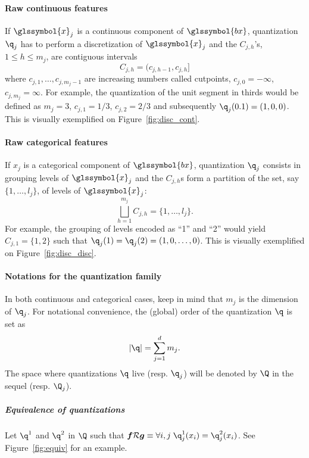 \paragraph{Raw continuous features} If $\glssymbol{x}_j$ is a continuous component of $\glssymbol{bx}$, quantization $\q_j$ has to perform a discretization of $\glssymbol{x}_j$ and the $C_{j,h}$'s, $1\le h\le m_j$, are contiguous intervals  
\begin{equation}\label{eq:Cjhcont}
C_{j,h}=(c_{j,h-1},c_{j,h}]
\end{equation}
where $c_{j,1},\ldots,c_{j,m_j-1}$ are increasing numbers called cutpoints, $c_{j,0}=-\infty$, $c_{j,m_j}=\infty$. For example, the quantization of the unit segment in thirds would be defined as $m_j=3$, $c_{j,1} = 1/3$, $c_{j,2} = 2/3$ and subsequently $\q_j(0.1) = (1,0,0)$. This is visually exemplified on Figure~\ref{fig:disc_cont}.
\paragraph{Raw categorical features} If $x_j$ is a categorical component of $\glssymbol{bx}$, quantization $\q_j$ consists in grouping levels of $\glssymbol{x}_j$ and the $C_{j,h}$s form a partition of the set, say $\{1,\ldots,l_j\}$, of levels of $\glssymbol{x}_j$: 
\begin{equation*}
\bigsqcup_{h=1}^{m_j}C_{j,h}=\{1,\ldots,l_j\}.
\end{equation*}
For example, the grouping of levels encoded as ``1'' and ``2'' would yield $C_{j,1} = \{1,2\}$ such that $\q_j(1) = \q_j(2) = (1,0,\ldots,0)$. This is visually exemplified on Figure~\ref{fig:disc_disc}.

\paragraph{Notations for the quantization family}

In both continuous and categorical cases, keep in mind that $m_j$ is the dimension of $\q_j$. For notational convenience, the (global) order of the quantization $\q$ is set as 
\[|\q|=\sum_{j=1}^d m_j.\]
The space where quantizations $\q$ live (resp. $\q_j$) will be denoted by $\Q$ in the sequel (resp. $\Q_j$).

\subparagraph{Equivalence of quantizations} \label{par:equiv}

Let $\q^1$ and $\q^2$ in $\Q$ such that $\boldsymbol{f} \mathcal{R} \boldsymbol{g} \equiv \forall i,j \; \q^1_j(x_i) = \q^2_j(x_i)$. See Figure~\ref{fig:equiv} for an example.

